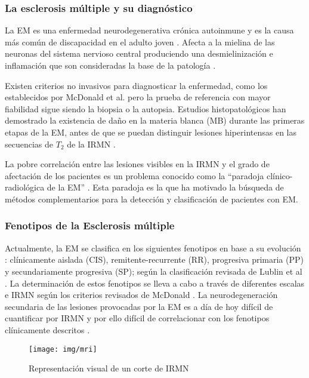 \documentclass[fleqn,12pt]{UICArticle} %
\begin{document}
\subsubsection{La esclerosis múltiple y su diagnóstico}

La EM es una enfermedad neurodegenerativa crónica autoinmune y es la causa más común de discapacidad en el adulto joven \cite{Polman2011}. Afecta a la mielina de las neuronas del sistema nervioso central produciendo una desmielinización e inflamación que son consideradas la base de la patología \cite{Br2005}.

Existen criterios no invasivos para diagnosticar la enfermedad, como los establecidos por McDonald et al.\cite{Lublin2014} pero la prueba de referencia con mayor fiabilidad sigue siendo la biopsia o la autopsia. Estudios histopatológicos han demostrado la existencia de daño en la materia blanca (MB) durante las primeras etapas de la EM, antes de que se puedan distinguir lesiones hiperintensas en las secuencias de $T_2$ de la IRMN \cite{Beer2016, Moll2011, Miller2003}.

La pobre correlación entre las lesiones visibles en la IRMN y el grado de afectación de los pacientes es un problema conocido como la “paradoja clínico-radiológica de la EM” \cite{Barkhof2002}. Esta paradoja es la que ha motivado la búsqueda de métodos complementarios para la detección y clasificación de pacientes con EM. 

\subsubsection{Fenotipos de la Esclerosis múltiple}

Actualmente, la EM se clasifica en los siguientes fenotipos en base a su evolución : clínicamente aislada (CIS), remitente-recurrente (RR), progresiva primaria (PP) y secundariamente progresiva (SP); según la clasificación revisada de Lublin et al \cite{Lublin2014}. La determinación de estos fenotipos se lleva a cabo a través de diferentes escalas e IRMN según los criterios revisados de McDonald \cite{Polman20112}. La neurodegeneración secundaria de las lesiones provocadas por la EM es a día de hoy difícil de cuantificar por IRMN y por ello difícil de correlacionar con los fenotipos clínicamente descritos \cite{Miller2003}. 

\begin{figure}[h]
	\centering
	\texttt{[image: img/mri]}
	\caption{Representación visual de un corte de IRMN}
	\label{fig:voxeles}
\end{figure}
\end{document}
